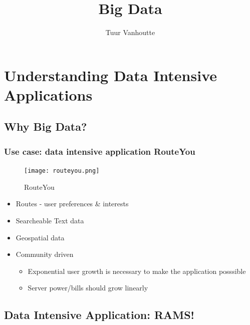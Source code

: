\documentclass{article}
\begin{document}
\begin{titlepage}
    \author{Tuur Vanhoutte}
    \title{Big Data}
\end{titlepage}

\maketitle
\newpage
\tableofcontents
\newpage


\section{Understanding Data Intensive Applications}

\subsection{Why Big Data?}

\subsubsection{Use case: data intensive application RouteYou}

\begin{figure}[H]
    \centering
    \texttt{[image: routeyou.png]}
    \caption{RouteYou}
\end{figure}

\begin{itemize}
    \item Routes - user preferences \& interests
    \item Searcheable Text data
    \item Geospatial data
    \item Community driven
    \begin{itemize}
        \item Exponential user growth is necessary to make the application posssible
        \item Server power/bills should grow linearly
    \end{itemize}
\end{itemize}

\subsection{Data Intensive Application: RAMS!}
\end{document}
